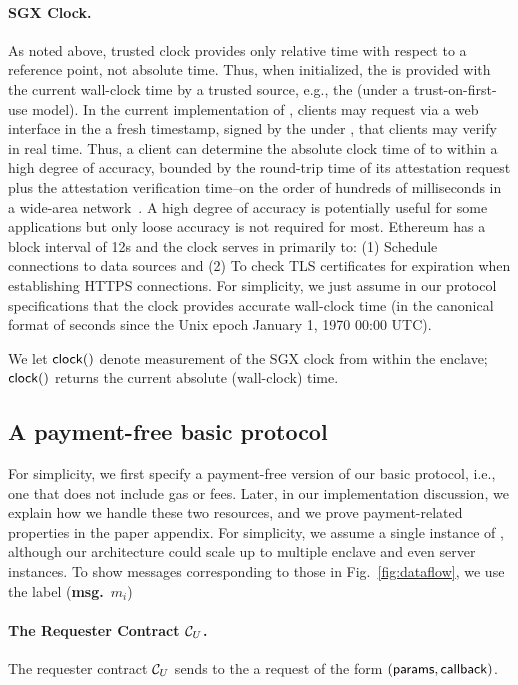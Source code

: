 \paragraph{\bf SGX Clock.}
As noted above, trusted clock provides only relative time with respect to a reference point, not absolute time. Thus, when initialized, the \encname is provided with the current wall-clock time by a trusted source, e.g., the \medname (under a trust-on-first-use model). In the current implementation of \tc, clients may request via a web interface in the \medname a fresh timestamp, signed by the \encname under \pkTC, that clients may verify in real time. Thus, a client can determine the absolute clock time of \encname to within a high degree of accuracy, bounded by the round-trip time of its attestation request plus the attestation verification time--on the order of hundreds of milliseconds in a wide-area network~\cite{}. A high degree of accuracy is potentially useful for some applications but only loose accuracy is not required for most. Ethereum has a block interval of 12s and the clock serves in \tc primarily to: (1) Schedule connections to data sources and (2) To check TLS certificates for expiration when establishing HTTPS connections. For simplicity, we just assume in our protocol specifications that the \encname clock provides accurate wall-clock time (in the canonical format of seconds since the Unix epoch January 1, 1970 00:00 UTC).

We let ${{\sf clock}}()$ denote measurement of the SGX clock from within the enclave; ${{\sf clock}}()$ returns the current absolute (wall-clock) time. 


\subsection{A payment-free basic protocol}
For simplicity, we first specify a payment-free version of our basic protocol, i.e., one that does not include gas or fees. Later, in our implementation discussion, we explain how we handle these two resources, and we prove payment-related properties in the paper appendix. For simplicity, we assume a single instance of \engine, although our architecture could scale up to multiple enclave and even server instances. To show messages corresponding to those in Fig.~\ref{fig:dataflow}, we use the label ({\bf msg.}~$m_i$)

\paragraph{The Requester Contract ${\cal C}_U$.}
The requester contract ${\cal C}_U$ sends to the \tcontract \tcont
a request of the form $({\sf params}, {\sf callback})$.

